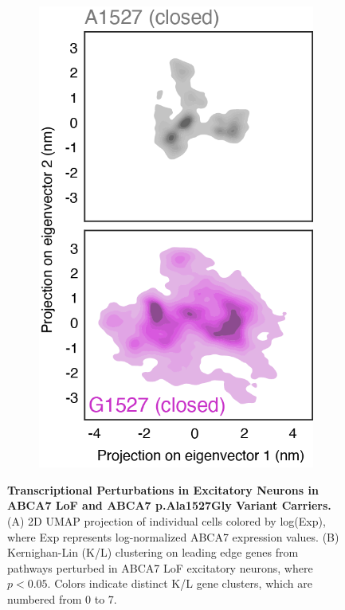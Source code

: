 \begin{figure}[ht]
\begin{subfigure}[t]{0.16\textwidth}
        \includegraphics[width=\textwidth]{./main_plots/variant_projection_closed.png}        
    \end{subfigure}
    \caption{
        \textbf{Transcriptional Perturbations in Excitatory Neurons in ABCA7 LoF and ABCA7 p.Ala1527Gly Variant Carriers.}\\[1ex]
        (A) 2D UMAP projection of individual cells colored by log(Exp), where Exp represents log-normalized ABCA7 expression values.
        (B) Kernighan-Lin (K/L) clustering on leading edge genes from pathways perturbed in ABCA7 LoF excitatory neurons, where $p<0.05$. Colors indicate distinct K/L gene clusters, which are numbered from 0 to 7.
}
\end{figure}

